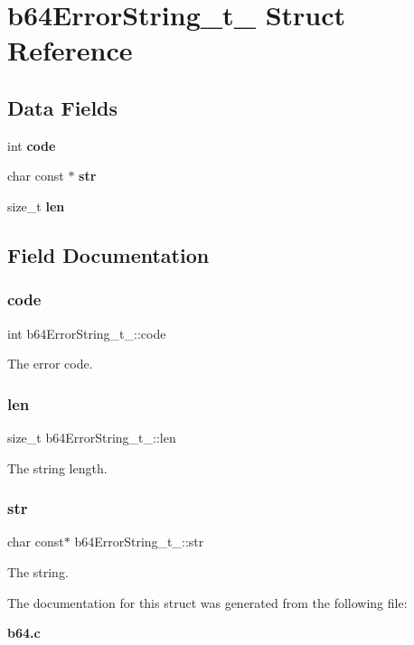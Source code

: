 \section{b64\+Error\+String\+\_\+t\+\_\+ Struct Reference}
\label{structb64ErrorString__t__}
\subsection*{Data Fields}
\begin{DoxyCompactItemize}
\item 
int \textbf{ code}
\item 
char const  $\ast$ \textbf{ str}
\item 
size\+\_\+t \textbf{ len}
\end{DoxyCompactItemize}


\subsection{Field Documentation}
\mbox{\label{structb64ErrorString__t___abc14a7cbc65d71311340950a9b300944}} 
\subsubsection{code}
{\footnotesize\ttfamily int b64\+Error\+String\+\_\+t\+\_\+\+::code}

The error code. \mbox{\label{structb64ErrorString__t___a2c99a921d225217da271a97114ce2658}} 
\subsubsection{len}
{\footnotesize\ttfamily size\+\_\+t b64\+Error\+String\+\_\+t\+\_\+\+::len}

The string length. \mbox{\label{structb64ErrorString__t___aa6eecf23d29debb42e999c6909a056e6}} 
\subsubsection{str}
{\footnotesize\ttfamily char const$\ast$ b64\+Error\+String\+\_\+t\+\_\+\+::str}

The string. 

The documentation for this struct was generated from the following file\+:\begin{DoxyCompactItemize}
\item 
\textbf{ b64.\+c}\end{DoxyCompactItemize}
